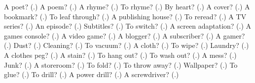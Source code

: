\begin{tcolorbox}[breakable,colback=teal!4,colframe=teal!35!black,title={Before you move on}]
A poet? (\textbf{}.) A poem? (\textbf{}.) A rhyme? (\textbf{}.) To rhyme? (\textbf{}.) By heart? (\textbf{}.) A cover? (\textbf{}.) A bookmark? (\textbf{}.) To leaf through? (\textbf{}.) A publishing house? (\textbf{}.) To reread? (\textbf{}.) A TV series? (\textbf{}.) An episode? (\textbf{}.) Subtitles? (\textbf{}.) To switch? (\textbf{}.) A screen adaptation? (\textbf{}.) A games console? (\textbf{}.) A video game? (\textbf{}.) A blogger? (\textbf{}.) A subscriber? (\textbf{}.) A gamer? (\textbf{}.) Dust? (\textbf{}.) Cleaning? (\textbf{}.) To vacuum? (\textbf{}.) A cloth? (\textbf{}.) To wipe? (\textbf{}.) Laundry? (\textbf{}.) A clothes peg? (\textbf{}.) A stain? (\textbf{}.) To hang out? (\textbf{}.) To wash out? (\textbf{}.) A mess? (\textbf{}.) Junk? (\textbf{}.) A storeroom? (\textbf{}.) To fold? (\textbf{}.) To throw away? (\textbf{}.) Wallpaper? (\textbf{}.) To glue? (\textbf{}.) To drill? (\textbf{}.) A power drill? (\textbf{}.) A screwdriver? (\textbf{}.)
\end{tcolorbox}
